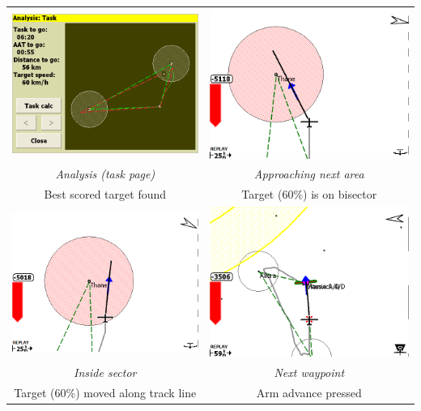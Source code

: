 \documentclass[a4paper,12pt]{refrep}
\begin{document}
\begin{maxipage}
\begin{center}
\begin{longtable}{|c|c|}
\toprule
\includegraphics[angle=0,width=0.45\linewidth,keepaspectratio='true']{figures/faat07.png} & 
\includegraphics[angle=0,width=0.45\linewidth,keepaspectratio='true']{figures/faat08.png} \\
{\em Analysis (task page)} & {\em Approaching next area} \\
Best scored target found & Target (60\%) is on bisector \\

 \midrule

\includegraphics[angle=0,width=0.45\linewidth,keepaspectratio='true']{figures/faat09.png} & 
\includegraphics[angle=0,width=0.45\linewidth,keepaspectratio='true']{figures/faat11.png} \\
{\em Inside sector} & {\em Next waypoint} \\
Target (60\%) moved along track line & Arm advance pressed \\


\end{longtable}
\end{center}
\end{maxipage}
\end{document}
